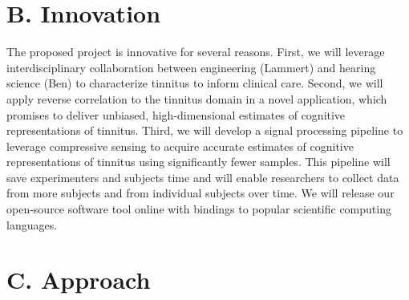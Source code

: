 \documentclass[11pt, notitlepage]{article} %
\begin{document}


\section*{B. Innovation}

The proposed project is innovative for several reasons.
First, we will leverage interdisciplinary collaboration between engineering (Lammert)
and hearing science (Ben) to characterize tinnitus to inform clinical care.
Second, we will apply reverse correlation to the tinnitus domain in a novel application,
which promises to deliver unbiased, high-dimensional estimates of cognitive representations of tinnitus.
Third, we will develop a signal processing pipeline to leverage compressive sensing
to acquire accurate estimates of cognitive representations of tinnitus using significantly fewer samples.
This pipeline will save experimenters and subjects time and will enable researchers
to collect data from more subjects and from individual subjects over time.
We will release our open-source software tool online with bindings to popular scientific computing languages.


\section*{C. Approach}
\end{document}
